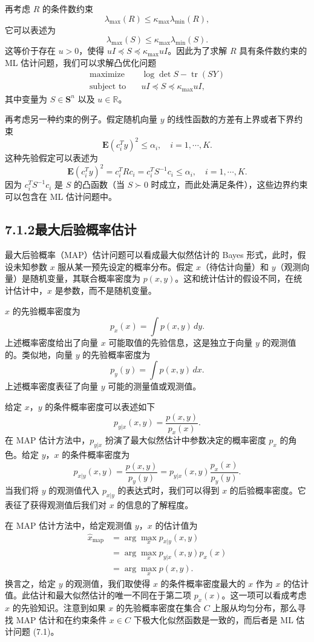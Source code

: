 \documentclass[UTF8,12pt,a4paper,fontset=fandol]{ctexart}
\begin{document}
再考虑 $R$ 的条件数约束
\[
\lambda_{\max}(R)\leq \kappa_{\max}\lambda_{\min}(R),
\]
它可以表述为
\[
\lambda_{\max}(S)\leq \kappa_{\max}\lambda_{\min}(S).
\]
这等价于存在 $u>0$，使得 $uI\preceq S\preceq \kappa_{\max}uI$。因此为了求解 $R$ 具有条件数约束的 ML 估计问题，我们可以求解凸优化问题
\begin{equation}
\begin{aligned}
\text{maximize}\quad & \log\det S-\operatorname{tr}(SY)\\
\text{subject to}\quad & uI\preceq S\preceq \kappa_{\max}uI,
\end{aligned}
\tag{7.5}
\end{equation}
其中变量为 $S\in\mathbf{S}^n$ 以及 $u\in\mathbb{R}$。

再考虑另一种约束的例子。假定随机向量 $y$ 的线性函数的方差有上界或者下界约束
\[
\mathbf{E}(c_i^T y)^2\leq \alpha_i,\quad i=1,\cdots,K.
\]
这种先验假定可以表述为
\[
\mathbf{E}(c_i^T y)^2=c_i^TRc_i=c_i^TS^{-1}c_i\leq \alpha_i,\quad i=1,\cdots,K.
\]
因为 $c_i^TS^{-1}c_i$ 是 $S$ 的凸函数（当 $S\succ 0$ 时成立，而此处满足条件），这些边界约束可以包含在 ML 估计问题中。

\subsection*{7.1.2\quad 最大后验概率估计}

最大后验概率（MAP）估计问题可以看成最大似然估计的 Bayes 形式，此时，假设未知参数 $x$ 服从某一预先设定的概率分布。假定 $x$（待估计向量）和 $y$（观测向量）是随机变量，其联合概率密度为 $p(x,y)$。这和统计估计的假设不同，在统计估计中，$x$ 是参数，而不是随机变量。

$x$ 的先验概率密度为
\[
p_x(x)=\int p(x,y)\,dy.
\]
上述概率密度给出了向量 $x$ 可能取值的先验信息，这是独立于向量 $y$ 的观测值的。类似地，向量 $y$ 的先验概率密度为
\[
p_y(y)=\int p(x,y)\,dx.
\]
上述概率密度表征了向量 $y$ 可能的测量值或观测值。

给定 $x$，$y$ 的条件概率密度可以表述如下
\[
p_{y|x}(x,y)=\frac{p(x,y)}{p_x(x)}.
\]
在 MAP 估计方法中，$p_{y|x}$ 扮演了最大似然估计中参数决定的概率密度 $p_x$ 的角色。给定 $y$，$x$ 的条件概率密度为
\[
p_{x|y}(x,y)=\frac{p(x,y)}{p_y(y)}=p_{y|x}(x,y)\frac{p_x(x)}{p_y(y)}.
\]
当我们将 $y$ 的观测值代入 $p_{x|y}$ 的表达式时，我们可以得到 $x$ 的后验概率密度。它表征了获得观测值后我们对 $x$ 的信息的了解程度。

在 MAP 估计方法中，给定观测值 $y$，$x$ 的估计值为
\[
\begin{aligned}
\hat{x}_{\mathrm{map}}
&=\arg\max_x p_{x|y}(x,y)\\
&=\arg\max_x p_{y|x}(x,y)p_x(x)\\
&=\arg\max_x p(x,y).
\end{aligned}
\]
换言之，给定 $y$ 的观测值，我们取使得 $x$ 的条件概率密度最大的 $x$ 作为 $x$ 的估计值。此估计和最大似然估计的唯一不同在于第二项 $p_x(x)$。这一项可以看成考虑 $x$ 的先验知识。注意到如果 $x$ 的先验概率密度在集合 $C$ 上服从均匀分布，那么寻找 MAP 估计和在约束条件 $x\in C$ 下极大化似然函数是一致的，而后者是 ML 估计问题 (7.1)。
\end{document}
